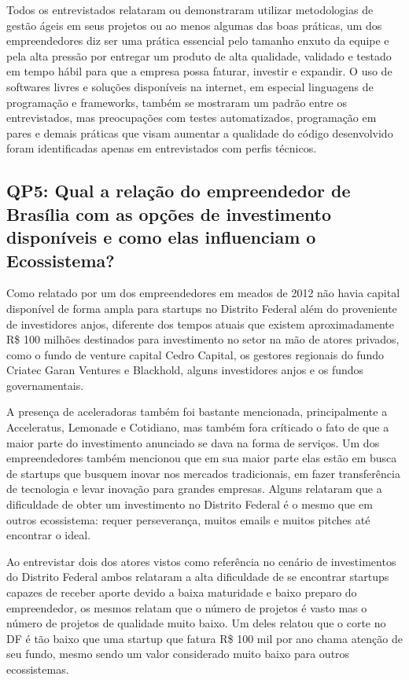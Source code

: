 Todos os entrevistados relataram ou demonstraram utilizar metodologias de gestão ágeis em seus projetos ou ao menos algumas das boas práticas, um dos empreendedores diz ser uma prática essencial pelo tamanho enxuto da equipe e pela alta pressão por entregar um produto de alta qualidade, validado e testado em tempo hábil para que a empresa possa faturar, investir e expandir. O uso de softwares livres e soluções disponíveis na internet, em especial linguagens de programação e frameworks, também se mostraram um padrão entre os entrevistados, mas preocupações com testes automatizados, programação em pares e demais práticas que visam aumentar a qualidade do código desenvolvido foram identificadas apenas em entrevistados com perfis técnicos.

\subsection{QP5: Qual a relação do empreendedor de Brasília com as opções de investimento disponíveis e como elas influenciam o Ecossistema?}
\label{subsection:pergunta_de_pesquisa_5}

Como relatado por um dos empreendedores em meados de 2012 não havia capital disponível de forma ampla para startups no Distrito Federal além do proveniente de investidores anjos, diferente dos tempos atuais que existem aproximadamente R\$ 100 milhões destinados para investimento no setor na mão de atores privados, como o fundo de venture capital Cedro Capital, os gestores regionais do fundo Criatec Garan Ventures e Blackhold, alguns investidores anjos e os fundos governamentais. 

A presença de aceleradoras também foi bastante mencionada, principalmente a Acceleratus, Lemonade e Cotidiano, mas também fora críticado o fato de que a maior parte do investimento anunciado se dava na forma de serviços. Um dos empreendedores também mencionou que em sua maior parte elas estão em busca de startups que busquem inovar nos mercados tradicionais, em fazer transferência de tecnologia e levar inovação para grandes empresas. Alguns relataram que a dificuldade de obter um investimento no Distrito Federal é o mesmo que em outros ecossistema: requer perseverança, muitos emails e muitos pitches até encontrar o ideal.

Ao entrevistar dois dos atores vistos como referência no cenário de investimentos do Distrito Federal ambos relataram a alta dificuldade de se encontrar startups capazes de receber aporte devido a baixa maturidade e baixo preparo do empreendedor, os mesmos relatam que o número de projetos é vasto mas o número de projetos de qualidade muito baixo. Um deles relatou que o corte no DF é tão baixo que uma startup que fatura R\$ 100 mil por ano chama atenção de seu fundo, mesmo sendo um valor considerado muito baixo para outros ecossistemas. 


